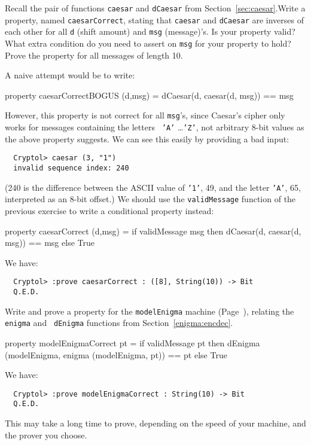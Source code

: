 \begin{Exercise}\label{ex:cond:3}
  Recall the pair of functions {\tt caesar} and {\tt dCaesar} from
  Section~\ref{sec:caesar}.\indCaesarscipher Write a property, named
  {\tt caesarCorrect}, stating that {\tt caesar} and {\tt dCaesar} are
  inverses of each other for all {\tt d} (shift amount) and {\tt msg}
  (message)'s. Is your property valid? What extra condition do you
  need to assert on {\tt msg} for your property to hold? Prove the
  property for all messages of length 10.
\end{Exercise}
\begin{Answer}
  A naive attempt would be to write:
\begin{code}
  property caesarCorrectBOGUS (d,msg) =
           dCaesar(d, caesar(d, msg)) == msg
\end{code}
However, this property is not correct for all {\tt msg}'s, since
Caesar's cipher only works for messages containing the letters {\tt
  'A'} \ldots {\tt 'Z'}, not arbitrary 8-bit values as the above
property suggests. We can see this easily by providing a bad input:
\begin{Verbatim}
  Cryptol> caesar (3, "1")
  invalid sequence index: 240
\end{Verbatim}
(240 is the difference between the ASCII value of {\tt '1'}, 49, and
the letter {\tt 'A'}, 65, interpreted as an 8-bit offset.) We should
use the {\tt validMessage} function of the previous exercise to write
a conditional property instead:
\begin{code}
  property caesarCorrect (d,msg) = if validMessage msg
                                   then dCaesar(d, caesar(d, msg)) == msg
                                   else True
\end{code}
We have:
\begin{Verbatim}
  Cryptol> :prove caesarCorrect : ([8], String(10)) -> Bit
  Q.E.D.
\end{Verbatim}
\end{Answer}

\begin{Exercise}\label{ex:cond:4}
  Write and prove a property for the {\tt modelEnigma} machine
  (Page~\pageref{def:modelEnigma}), relating the {\tt enigma} and {\tt
    dEnigma} functions from Section~\ref{enigma:encdec}.
\end{Exercise}
\begin{Answer}
\begin{code}
  property modelEnigmaCorrect pt =
       if validMessage pt
       then dEnigma (modelEnigma, enigma (modelEnigma, pt)) == pt
       else True
\end{code}
We have:
\begin{Verbatim}
  Cryptol> :prove modelEnigmaCorrect : String(10) -> Bit
  Q.E.D.
\end{Verbatim}
\end{Answer}
This may take a long time to prove, depending on the speed of your
machine, and the prover you choose.

